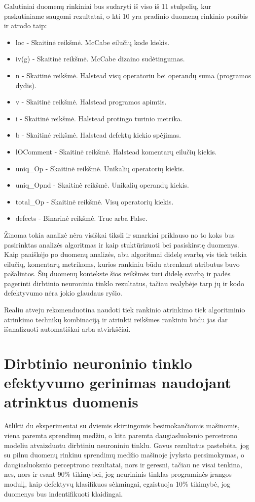 \documentclass{VUMIFPSbakalaurinis}
\begin{document}
Galutiniai duomenų rinkiniai bus sudaryti iš viso iš 11 stulpelių, kur paskutiniame saugomi rezultatai, o kti 10 yra pradinio duomenų rinkinio poaibis ir atrodo taip:
\begin{itemize} 
\item[] loc - Skaitinė reikšmė. McCabe eilučių kode kiekis.
\item[] iv(g) - Skaitinė reikšmė. McCabe dizaino sudėtingumas.
\item[] n - Skaitinė reikšmė. Halstead visų operatoriu bei operandų suma (programos dydis).
\item[] v - Skaitinė reikšmė. Halstead programos apimtis.
\item[] i - Skaitinė reikšmė. Halstead protingo turinio metrika.
\item[] b - Skaitinė reikšmė. Halstead defektų kiekio spėjimas.
\item[] lOComment - Skaitinė reikšmė. Halstead komentarų eilučių kiekis.
\item[] uniq\_Op - Skaitinė reikšmė. Unikalių operatorių kiekis.
\item[] uniq\_Opnd - Skaitinė reikšmė. Unikalių operandų kiekis.
\item[] total\_Op - Skaitinė reikšmė. Visų operatorių kiekis.
\item[] defects - Binarinė reikšmė. True arba False.
\end{itemize}

Žinoma tokia analizė nėra visiškai tiksli ir smarkiai priklauso no to koks bus pasirinktas analizės algoritmas ir kaip stuktūrizuoti bei pasiskirstę duomenys. Kaip paaiškėjo po duomenų analizės, abu algoritmai didelę svarbą vis tiek teikia eilučių, komentarų metrikoms, kurios rankiniu būdu atrenkant atributus buvo pašalintos. Šių duomenų kontekste šios reikšmės turi didelę svarbą ir padės pagerinti dirbtinio neuroninio tinklo rezultatus, tačiau realybėje tarp jų ir kodo defektyvumo nėra jokio glaudaus ryšio.

Realiu atveju rekomenduotina naudoti tiek rankinio atrinkimo tiek algoritminio atrinkimo technikų kombinaciją ir atrinkti reikšmes rankiniu būdu jas dar išanalizuoti automatiškai arba atvirkščiai.

\section{Dirbtinio neuroninio tinklo efektyvumo gerinimas naudojant atrinktus duomenis}

Atlikti du eksperimentai su dviemis skirtingomis besimokančiomis mašinomis, viena paremta sprendimų medžiu, o kita paremta daugiasluoksnio percetrono modeliu atvaizduotu dirbtiniu neuroniniu tinklu. Gavus rezultatus pastebėta, jog su pilnu duomenų rinkinu sprendimų medžio mašinoje įvyksta persimokymas, o daugiasluoksnio perceptrono rezultatai, nors ir geresni, tačiau ne visai tenkina, nes, nors ir esant 90\% tikimybei, jog neurininis tinklas programinės įrangos modulį, kaip defektyvų klasifikuos sėkmingai, egzistuoja 10\% tikimybė, jog duomenys bus indentifikuoti klaidingai.
\end{document}
